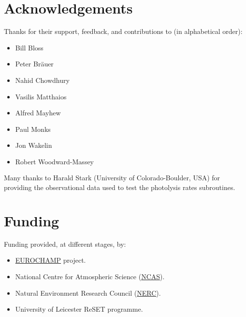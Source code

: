 \section{Acknowledgements} \label{sec:acknowledgements}

Thanks for their support, feedback, and contributions to (in alphabetical order):

\begin{itemize}
\item Bill Bloss
\item Peter Br{\"a}uer
\item Nahid Chowdhury
\item Vasilis Matthaios
\item Alfred Mayhew
\item Paul Monks
\item Jon Wakelin
\item Robert Woodward-Massey
\end{itemize}

Many thanks to Harald Stark (University of Colorado-Boulder, USA)
for providing the observational data used to test the photolysis rates
subroutines.

\section{Funding} \label{sec:funding}

Funding provided, at different stages, by:

\begin{itemize}
\item \href{https://www.eurochamp.org/}{EUROCHAMP} project.
\item National Centre for Atmospheric Science
  (\href{https://www.ncas.ac.uk/}{NCAS}).
\item Natural Environment Research Council
  (\href{https://nerc.ukri.org/}{NERC}).
\item University of Leicester ReSET programme.
\end{itemize}
